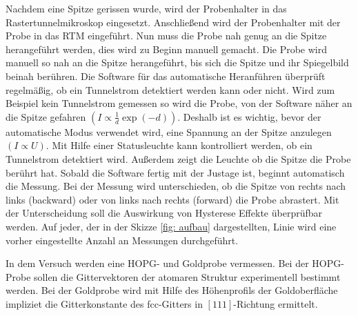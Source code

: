 Nachdem eine Spitze gerissen wurde, wird der Probenhalter in das Rastertunnelmikroskop eingesetzt.
Anschließend wird der Probenhalter mit der Probe in das RTM eingeführt.
Nun muss die Probe nah genug an die Spitze herangeführt werden, dies wird zu Beginn
manuell gemacht. Die Probe wird manuell so nah an die Spitze herangeführt, bis sich
die Spitze und ihr Spiegelbild beinah berühren. Die Software für das automatische
Heranführen überprüft regelmäßig, ob ein Tunnelstrom detektiert werden kann oder nicht. %
Wird zum Beispiel kein Tunnelstrom gemessen so wird die Probe, von der Software %
näher an die Spitze gefahren $\left(I\propto \frac{1}{d}\exp{(-d)}\right) $.
Deshalb ist es wichtig, bevor der automatische
Modus verwendet wird, eine Spannung an der Spitze anzulegen $\left(I\propto U\right)$. Mit Hilfe einer
Statusleuchte kann kontrolliert werden, ob ein Tunnelstrom detektiert wird. Außerdem zeigt die Leuchte
ob die Spitze die Probe berührt hat.
Sobald die Software fertig mit der Justage ist, beginnt automatisch die Messung.
Bei der Messung wird unterschieden, ob die Spitze von rechts nach links (backward) oder von links nach rechts (forward) %
die Probe abrastert. Mit der Unterscheidung soll die Auswirkung von Hysterese Effekte überprüfbar werden. %
Auf jeder, der in der Skizze \ref{fig: aufbau} dargestellten, Linie wird eine vorher eingestellte
Anzahl an Messungen durchgeführt.

In dem Versuch werden eine HOPG- und Goldprobe vermessen.
Bei der HOPG-Probe sollen die Gittervektoren der atomaren Struktur
experimentell bestimmt werden.
Bei der Goldprobe wird mit Hilfe des Höhenprofils der Goldoberfläche impliziet
die Gitterkonstante des fcc-Gitters in $[111]$-Richtung ermittelt.
